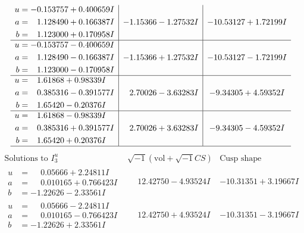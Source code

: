 \documentclass[1p]{elsarticle_modified}
\theoremstyle{definition}
\newcommand{\I}{\sqrt{-1}}
\begin{document}
$$\begin{array}{c|c|c}
\begin{aligned}
u &= -0.153757 + 0.400659 I \\
a &= \phantom{-}1.128490 + 0.166387 I \\
b &= \phantom{-}1.123000 + 0.170958 I\end{aligned}
 & -1.15366 - 1.27532 I & -10.53127 + 1.72199 I \\ \hline\begin{aligned}
u &= -0.153757 - 0.400659 I \\
a &= \phantom{-}1.128490 - 0.166387 I \\
b &= \phantom{-}1.123000 - 0.170958 I\end{aligned}
 & -1.15366 + 1.27532 I & -10.53127 - 1.72199 I \\ \hline\begin{aligned}
u &= \phantom{-}1.61868 + 0.98339 I \\
a &= \phantom{-}0.385316 - 0.391577 I \\
b &= \phantom{-}1.65420 - 0.20376 I\end{aligned}
 & \phantom{-}2.70026 - 3.63283 I & -9.34305 + 4.59352 I \\ \hline\begin{aligned}
u &= \phantom{-}1.61868 - 0.98339 I \\
a &= \phantom{-}0.385316 + 0.391577 I \\
b &= \phantom{-}1.65420 + 0.20376 I\end{aligned}
 & \phantom{-}2.70026 + 3.63283 I & -9.34305 - 4.59352 I\\
 \hline 
 \end{array}$$\newpage$$\begin{array}{c|c|c}  
\text{Solutions to }I^u_{3}& \I (\text{vol} + \sqrt{-1}CS) & \text{Cusp shape}\\
 \hline 
\begin{aligned}
u &= \phantom{-}0.05666 + 2.24811 I \\
a &= \phantom{-}0.010165 + 0.766423 I \\
b &= -1.22626 - 2.33561 I\end{aligned}
 & \phantom{-}12.42750 - 4.93524 I & -10.31351 + 3.19667 I \\ \hline\begin{aligned}
u &= \phantom{-}0.05666 - 2.24811 I \\
a &= \phantom{-}0.010165 - 0.766423 I \\
b &= -1.22626 + 2.33561 I\end{aligned}
 & \phantom{-}12.42750 + 4.93524 I & -10.31351 - 3.19667 I \\ \hline\begin{aligned}

\end{aligned}
\end{array}$$
\end{document}
